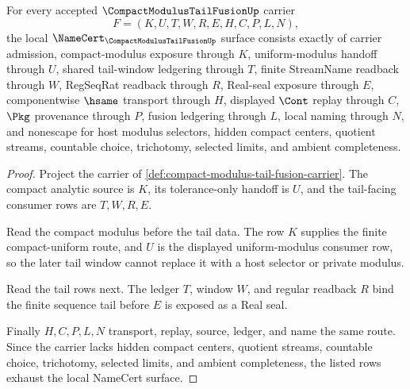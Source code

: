 \begin{theorem}
\label{thm:compact-modulus-tail-fusion-obligations}
For every accepted $\CompactModulusTailFusionUp$ carrier
$$
F=(K,U,T,W,R,E,H,C,P,L,N),
$$
the local $\NameCert_{\CompactModulusTailFusionUp}$ surface consists exactly of carrier admission, compact-modulus exposure through $K$, uniform-modulus handoff through $U$, shared tail-window ledgering through $T$, finite StreamName readback through $W$, RegSeqRat readback through $R$, Real-seal exposure through $E$, componentwise $\hsame$ transport through $H$, displayed $\Cont$ replay through $C$, $\Pkg$ provenance through $P$, fusion ledgering through $L$, local naming through $N$, and nonescape for host modulus selectors, hidden compact centers, quotient streams, countable choice, trichotomy, selected limits, and ambient completeness.
\end{theorem}
\begin{proof}
Project the carrier of \autoref{def:compact-modulus-tail-fusion-carrier}. The compact analytic source is $K$, its tolerance-only handoff is $U$, and the tail-facing consumer rows are $T,W,R,E$.

Read the compact modulus before the tail data. The row $K$ supplies the finite compact-uniform route, and $U$ is the displayed uniform-modulus consumer row, so the later tail window cannot replace it with a host selector or private modulus.

Read the tail rows next. The ledger $T$, window $W$, and regular readback $R$ bind the finite sequence tail before $E$ is exposed as a Real seal.

Finally $H,C,P,L,N$ transport, replay, source, ledger, and name the same route. Since the carrier lacks hidden compact centers, quotient streams, countable choice, trichotomy, selected limits, and ambient completeness, the listed rows exhaust the local NameCert surface.
\end{proof}


